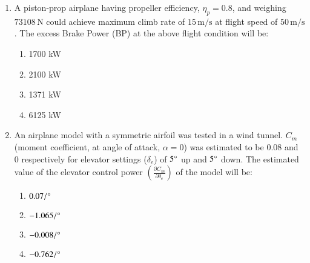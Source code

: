 \documentclass[journal]{IEEEtran}
\theoremstyle{remark}
\begin{document}
\begin{enumerate}[start=18]
\item  A piston-prop airplane having propeller efficiency, $\eta_p = 0.8$, and weighing $73108 \, \text{N}$ could achieve maximum climb rate of $15 \, \text{m/s}$ at flight speed of $50 \, \text{m/s}$. The excess Brake Power (BP) at the above flight condition will be:
\begin{multicols}{4}
\begin{enumerate}
\item 1700 kW
\item 2100 kW
\item 1371 kW
\item 6125 kW
\end{enumerate}
\end{multicols}
\item  An airplane model with a symmetric airfoil was tested in a wind tunnel. $C_{m}$ (moment coefficient, at angle of attack, $\alpha = 0$) was estimated to be 0.08 and 0 respectively for elevator settings ($\delta_e$) of $5 \degree$ up and $5 \degree$ down. The estimated value of the elevator control power $\left( \frac{\partial C_m}{\partial \delta_e} \right)$ of the model will be:
\begin{multicols}{4}
\begin{enumerate}
\item $0.07 / \degree$
\item $-1.065 / \degree$
\item $-0.008 / \degree$
\item $-0.762 / \degree$
\end{enumerate}
\end{multicols}



\end{enumerate}
\end{document}
